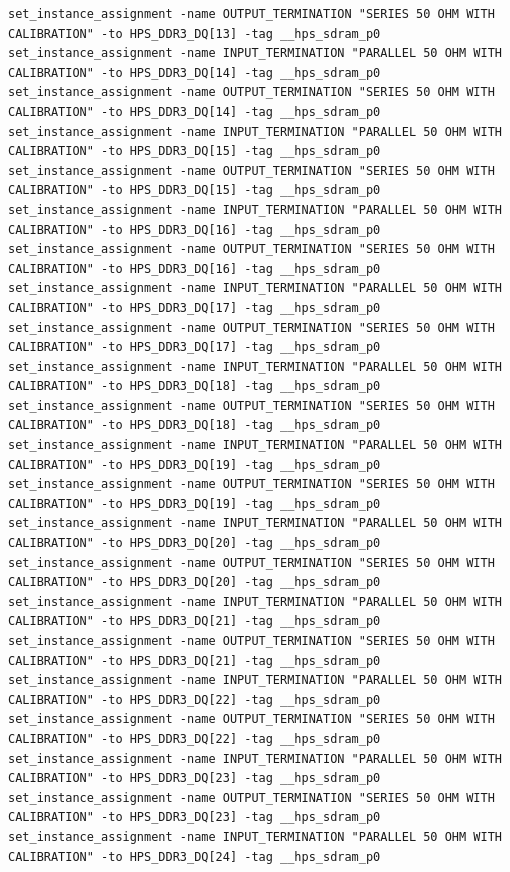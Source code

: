 \documentclass[conference]{IEEEtran}
\begin{document}
\begin{lstlisting}
set_instance_assignment -name OUTPUT_TERMINATION "SERIES 50 OHM WITH CALIBRATION" -to HPS_DDR3_DQ[13] -tag __hps_sdram_p0
set_instance_assignment -name INPUT_TERMINATION "PARALLEL 50 OHM WITH CALIBRATION" -to HPS_DDR3_DQ[14] -tag __hps_sdram_p0
set_instance_assignment -name OUTPUT_TERMINATION "SERIES 50 OHM WITH CALIBRATION" -to HPS_DDR3_DQ[14] -tag __hps_sdram_p0
set_instance_assignment -name INPUT_TERMINATION "PARALLEL 50 OHM WITH CALIBRATION" -to HPS_DDR3_DQ[15] -tag __hps_sdram_p0
set_instance_assignment -name OUTPUT_TERMINATION "SERIES 50 OHM WITH CALIBRATION" -to HPS_DDR3_DQ[15] -tag __hps_sdram_p0
set_instance_assignment -name INPUT_TERMINATION "PARALLEL 50 OHM WITH CALIBRATION" -to HPS_DDR3_DQ[16] -tag __hps_sdram_p0
set_instance_assignment -name OUTPUT_TERMINATION "SERIES 50 OHM WITH CALIBRATION" -to HPS_DDR3_DQ[16] -tag __hps_sdram_p0
set_instance_assignment -name INPUT_TERMINATION "PARALLEL 50 OHM WITH CALIBRATION" -to HPS_DDR3_DQ[17] -tag __hps_sdram_p0
set_instance_assignment -name OUTPUT_TERMINATION "SERIES 50 OHM WITH CALIBRATION" -to HPS_DDR3_DQ[17] -tag __hps_sdram_p0
set_instance_assignment -name INPUT_TERMINATION "PARALLEL 50 OHM WITH CALIBRATION" -to HPS_DDR3_DQ[18] -tag __hps_sdram_p0
set_instance_assignment -name OUTPUT_TERMINATION "SERIES 50 OHM WITH CALIBRATION" -to HPS_DDR3_DQ[18] -tag __hps_sdram_p0
set_instance_assignment -name INPUT_TERMINATION "PARALLEL 50 OHM WITH CALIBRATION" -to HPS_DDR3_DQ[19] -tag __hps_sdram_p0
set_instance_assignment -name OUTPUT_TERMINATION "SERIES 50 OHM WITH CALIBRATION" -to HPS_DDR3_DQ[19] -tag __hps_sdram_p0
set_instance_assignment -name INPUT_TERMINATION "PARALLEL 50 OHM WITH CALIBRATION" -to HPS_DDR3_DQ[20] -tag __hps_sdram_p0
set_instance_assignment -name OUTPUT_TERMINATION "SERIES 50 OHM WITH CALIBRATION" -to HPS_DDR3_DQ[20] -tag __hps_sdram_p0
set_instance_assignment -name INPUT_TERMINATION "PARALLEL 50 OHM WITH CALIBRATION" -to HPS_DDR3_DQ[21] -tag __hps_sdram_p0
set_instance_assignment -name OUTPUT_TERMINATION "SERIES 50 OHM WITH CALIBRATION" -to HPS_DDR3_DQ[21] -tag __hps_sdram_p0
set_instance_assignment -name INPUT_TERMINATION "PARALLEL 50 OHM WITH CALIBRATION" -to HPS_DDR3_DQ[22] -tag __hps_sdram_p0
set_instance_assignment -name OUTPUT_TERMINATION "SERIES 50 OHM WITH CALIBRATION" -to HPS_DDR3_DQ[22] -tag __hps_sdram_p0
set_instance_assignment -name INPUT_TERMINATION "PARALLEL 50 OHM WITH CALIBRATION" -to HPS_DDR3_DQ[23] -tag __hps_sdram_p0
set_instance_assignment -name OUTPUT_TERMINATION "SERIES 50 OHM WITH CALIBRATION" -to HPS_DDR3_DQ[23] -tag __hps_sdram_p0
set_instance_assignment -name INPUT_TERMINATION "PARALLEL 50 OHM WITH CALIBRATION" -to HPS_DDR3_DQ[24] -tag __hps_sdram_p0

\end{lstlisting}
\end{document}
